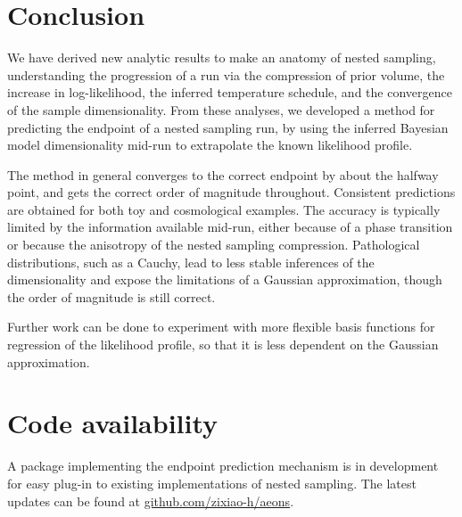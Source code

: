 \documentclass[usenatbib]{mnras}
\begin{document}
\section{Conclusion}
We have derived new analytic results to make an anatomy of nested sampling, understanding the progression of a run via the compression of prior volume, the increase in log-likelihood, the inferred temperature schedule, and the convergence of the sample dimensionality. From these analyses, we developed a method for predicting the endpoint of a nested sampling run, by using the inferred Bayesian model dimensionality mid-run to extrapolate the known likelihood profile. 
\par
The method in general converges to the correct endpoint by about the halfway point, and gets the correct order of magnitude throughout. Consistent predictions are obtained for both toy and cosmological examples. The accuracy is typically limited by the information available mid-run, either because of a phase transition or because the anisotropy of the nested sampling compression. Pathological distributions, such as a Cauchy, lead to less stable inferences of the dimensionality and expose the limitations of a Gaussian approximation, though the order of magnitude is still correct.
\par
Further work can be done to experiment with more flexible basis functions for regression of the likelihood profile, so that it is less dependent on the Gaussian approximation.

\section{Code availability}
A package implementing the endpoint prediction mechanism is in development for easy plug-in to existing implementations of nested sampling. The latest updates can be found at \href{https://github.com/zixiao-h/aeons}{github.com/zixiao-h/aeons}.

\appendix
\end{document}
